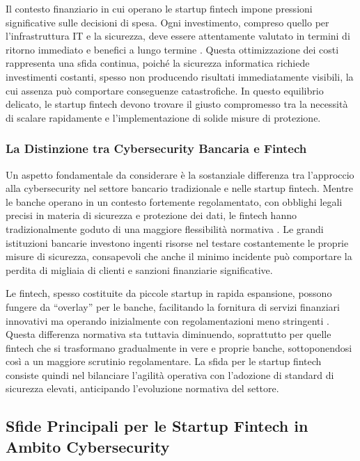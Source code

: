 \documentclass[a4paper,12pt]{report}
\begin{document}
Il contesto finanziario in cui operano le startup fintech impone pressioni significative sulle decisioni di spesa. Ogni investimento, compreso quello per l’infrastruttura IT e la sicurezza, deve essere attentamente valutato in termini di ritorno immediato e benefici a lungo termine \cite{fintechChallenges}. Questa ottimizzazione dei costi rappresenta una sfida continua, poiché la sicurezza informatica richiede investimenti costanti, spesso non producendo risultati immediatamente visibili, la cui assenza può comportare conseguenze catastrofiche. In questo equilibrio delicato, le startup fintech devono trovare il giusto compromesso tra la necessità di scalare rapidamente e l’implementazione di solide misure di protezione.

\subsubsection*{La Distinzione tra Cybersecurity Bancaria e Fintech}

Un aspetto fondamentale da considerare è la sostanziale differenza tra l’approccio alla cybersecurity nel settore bancario tradizionale e nelle startup fintech. Mentre le banche operano in un contesto fortemente regolamentato, con obblighi legali precisi in materia di sicurezza e protezione dei dati, le fintech hanno tradizionalmente goduto di una maggiore flessibilità normativa \cite{bankingVsFintech}. Le grandi istituzioni bancarie investono ingenti risorse nel testare costantemente le proprie misure di sicurezza, consapevoli che anche il minimo incidente può comportare la perdita di migliaia di clienti e sanzioni finanziarie significative.

Le fintech, spesso costituite da piccole startup in rapida espansione, possono fungere da “overlay” per le banche, facilitando la fornitura di servizi finanziari innovativi ma operando inizialmente con regolamentazioni meno stringenti \cite{bankingVsFintech}. Questa differenza normativa sta tuttavia diminuendo, soprattutto per quelle fintech che si trasformano gradualmente in vere e proprie banche, sottoponendosi così a un maggiore scrutinio regolamentare. La sfida per le startup fintech consiste quindi nel bilanciare l’agilità operativa con l’adozione di standard di sicurezza elevati, anticipando l’evoluzione normativa del settore.

\subsection*{Sfide Principali per le Startup Fintech in Ambito Cybersecurity}
\end{document}
